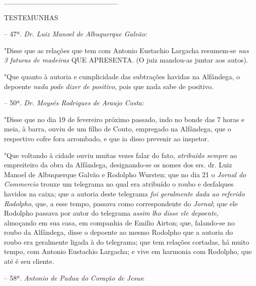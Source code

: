 \_\_\_\_\_\_\_\_\_\_\_\_\_\_\_\_\_\_\_\_\_\_

TESTEMUNHAS

-- 47ª. \emph{Dr. Luiz Manoel de Albuquerque Galvão:}

"Disse que as relações que tem com Antonio Eustachio Largacha resumem-se
\emph{nas 3 faturas de madeiras} QUE APRESENTA. (O juiz mandou-as juntar
aos autos).

"Que quanto à autoria e cumplicidade das subtrações havidas na
Alfândega, o depoente \emph{nada pode dizer de positivo}, pois que nada
sabe de positivo.

-- 50ª. \emph{Dr. Moysés Rodrigues de Araujo Costa:}

"Disse que no dia 19 de fevereiro próximo passado, indo no bonde das 7
horas e meia, à barra, ouviu de um filho de Couto, empregado na
Alfândega, que o respectivo cofre fora arrombado, e que ia disso
prevenir ao inspetor.

"Que voltando à cidade ouviu muitas vezes falar do fato, \emph{atribuído
sempre} ao empreiteiro da obra da Alfândega, designando-se os nomes dos
srs. dr. Luiz Manoel de Albuquerque Galvão e Rodolpho Wursten; que no
dia 21 o \emph{Jornal do Commercio} trouxe um telegrama no qual era
atribuído o roubo e desfalques havidos na caixa; que a autoria deste
telegrama \emph{foi geralmente dada ao referido Rodolpho}, que, a esse
tempo, passava como correspondente do \emph{Jornal}; que ele Rodolpho
passava por autor do telegrama \emph{assim lho disse ele depoente},
almoçando em sua casa, em companhia de Emilio Airton; que, falando-se no
roubo da Alfândega, disse o depoente ao mesmo Rodolpho que a autoria do
roubo era geralmente ligada à do telegrama; que tem relações cortadas,
há muito tempo, com Antonio Eustachio Largacha; e vive em harmonia com
Rodolpho, que até é seu cliente.

-- 58ª. \emph{Antonio de Padua do Coração de Jesus}:

